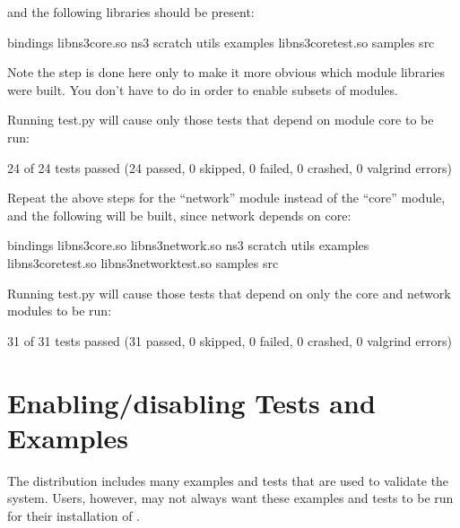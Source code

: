 \documentclass[letterpaper,10pt,english]{sphinxmanual}
\renewcommand{\sphinxcode}[1]{\texttt{\small{#1}}}
\begin{document}
and the following libraries should be present:

\begin{sphinxVerbatim}[commandchars=\\\{\}]
bindings  libns3\PYGZhy{}core.so       ns3      scratch  utils
examples  libns3\PYGZhy{}core\PYGZhy{}test.so  samples  src
\end{sphinxVerbatim}

Note the \sphinxcode{} step is done here only to make it more obvious which module libraries were built.  You don’t have to do \sphinxcode{} in order to enable subsets of modules.

Running test.py will cause only those tests that depend on module core to be run:

\begin{sphinxVerbatim}[commandchars=\\\{\}]
24 of 24 tests passed (24 passed, 0 skipped, 0 failed, 0 crashed, 0 valgrind errors)
\end{sphinxVerbatim}

Repeat the above steps for the “network” module instead of the “core” module, and the following will be built, since network depends on core:

\begin{sphinxVerbatim}[commandchars=\\\{\}]
bindings  libns3\PYGZhy{}core.so       libns3\PYGZhy{}network.so       ns3      scratch  utils
examples  libns3\PYGZhy{}core\PYGZhy{}test.so  libns3\PYGZhy{}network\PYGZhy{}test.so  samples  src
\end{sphinxVerbatim}

Running test.py will cause those tests that depend on only the core and network modules to be run:

\begin{sphinxVerbatim}[commandchars=\\\{\}]
31 of 31 tests passed (31 passed, 0 skipped, 0 failed, 0 crashed, 0 valgrind errors)
\end{sphinxVerbatim}


\section{Enabling/disabling  Tests and Examples}
\label{\detokenize{enable-tests:enabling-disabling-ns3-tests-and-examples}}\label{\detokenize{enable-tests::doc}}
The  distribution includes many examples and tests that are used to validate the  system.  Users, however, may not always want these examples and tests to be run for their installation of .
\end{document}

